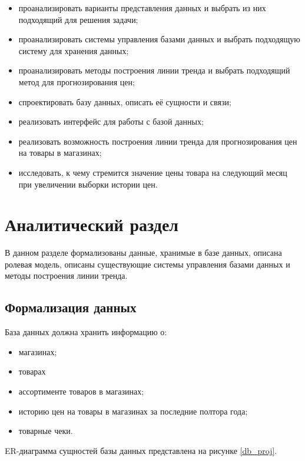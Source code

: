 \documentclass[a4paper,14pt]{extreport}
\begin{document}
\begin{itemize}
	\setlength\itemsep{0.01em}
	\item проанализировать варианты представления данных и выбрать из них подходящий для решения задачи;
	\item проанализировать системы управления базами данных и выбрать подходящую систему для хранения данных;
	\item проанализировать методы построения линии тренда и выбрать подходящий метод для прогнозирования цен;
	\item спроектировать базу данных, описать её сущности и связи;
	\item реализовать интерфейс для работы с базой данных;
	\item реализовать возможность построения линии тренда для прогнозирования цен на товары в магазинах;
	\item исследовать, к чему стремится значение цены товара на следующий месяц при увеличении выборки истории цен.
\end{itemize}
	
\chapter{Аналитический раздел}

В данном разделе формализованы данные, хранимые в базе данных, описана ролевая модель, описаны существующие системы управления базами данных и методы построения линии тренда.

\section{Формализация данных}

База данных должна хранить информацию о:

\begin{itemize}
	\setlength\itemsep{0.01em}
	\item магазинах;
	\item товарах
	\item ассортименте товаров в магазинах;
	\item историю цен на товары в магазинах за последние полтора года;
	\item товарные чеки.
\end{itemize}

ER-диаграмма сущностей базы данных представлена на рисунке \ref{db_proj}.
\end{document}
